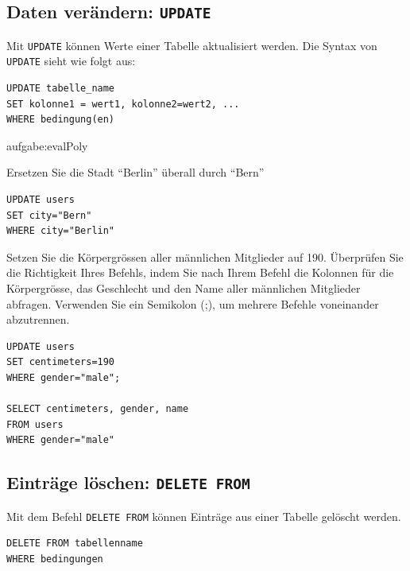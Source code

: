 \subsection{Daten verändern: \texorpdfstring{\lstinline[style=sql]|UPDATE|}{UPDATE}}

Mit \lstinline[style=sql]|UPDATE| können Werte einer Tabelle aktualisiert werden. Die Syntax von \lstinline[style=sql]|UPDATE| sieht wie folgt aus:

\begin{lstlisting}[style=sql]
UPDATE tabelle_name
SET kolonne1 = wert1, kolonne2=wert2, ...
WHERE bedingung(en)
\end{lstlisting}

\begin{myexercise}{aufgabe:evalPoly}

  Ersetzen Sie die Stadt ``Berlin'' überall durch ``Bern''
  \begin{myanswer}
    \begin{lstlisting}[style=sql]
UPDATE users
SET city="Bern"
WHERE city="Berlin"
\end{lstlisting}
  \end{myanswer}
\end{myexercise}

\begin{mysubmission}
  Setzen Sie die Körpergrössen aller männlichen Mitglieder auf 190. Überprüfen Sie die Richtigkeit Ihres Befehls, indem Sie nach Ihrem Befehl die Kolonnen für die Körpergrösse, das Geschlecht und den Name aller männlichen Mitglieder abfragen. Verwenden Sie ein Semikolon (;), um mehrere Befehle voneinander abzutrennen.
  \begin{myanswer}
    \begin{lstlisting}[style=sql]
UPDATE users
SET centimeters=190
WHERE gender="male"; 

SELECT centimeters, gender, name
FROM users
WHERE gender="male"
\end{lstlisting}
  \end{myanswer}
\end{mysubmission}

\subsection{Einträge löschen: \texorpdfstring{\lstinline[style=sql]|DELETE FROM|}{DELETE FROM}}
Mit dem Befehl \lstinline[style=sql]|DELETE FROM| können Einträge aus einer Tabelle gelöscht werden.
\begin{lstlisting}[style=sql]
DELETE FROM tabellenname
WHERE bedingungen
\end{lstlisting}

